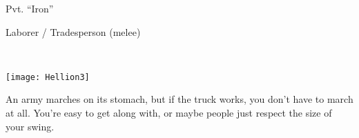\documentclass{article}
\newcommand{\Bra}{3}
\newcommand{\Agi}{2}
\newcommand{\Int}{3}
\newcommand{\Cun}{2}
\newcommand{\Wil}{2}
\newcommand{\Pre}{3}
\begin{document}
\begin{minipage}{0.6\linewidth}
{\Huge Pvt. ``Iron'' }

    {\large Laborer / Tradesperson (melee)}

\vspace{1.5em}

\end{minipage}\hfill%
\\

\vspace{0em}\raggedright
\begin{multicols}{2}
\texttt{[image: Hellion3]}

\columnbreak

An army marches on its stomach, but if the truck works, you don't have to march at all.  You're easy to get along with, or maybe people just respect the size of your swing.

\end{multicols}


\begin{center}
\Characteristics{\Bra}{\Agi}{\Int}{\Cun}{\Wil}{\Pre}

\noindent\null\hfill{}\quad
{}\null\quad
{}\quad
{}\hfill\null
{}\quad
\end{center}


\vspace{0.5em}



\vspace{-3em}
\end{document}
